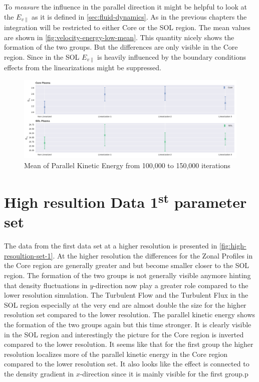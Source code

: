 \documentclass[master.tex]{subfiles}
\begin{document}
To \textit{measure} the influence in the parallel direction it might be helpful to look at the $E_{v\parallel}$ as it is defined in \autoref{sec:fluid-dynamics}.\newline
As in the previous chapters the integration will be restricted to either Core or the \ac{SOL} region. The mean values are shown in \autoref{fig:velocity-energy-low-mean}. This quantity nicely shows the formation of the two groups. But the differences are only visible in the Core region. Since in the \ac{SOL} $E_{v\parallel}$ is heavily influenced by the boundary conditions effects from the linearizations might be suppressed.

\begin{figure}[!htbp]
    \includegraphics[width=\linewidth]{pdfs/velocity-energy-low-means.pdf}
    \caption{Mean of Parallel Kinetic Energy from 100,000 to 150,000 iterations}
    \label{fig:velocity-energy-low-mean}
\end{figure}


\section{High resultion Data 1\textsuperscript{st} parameter set}
The data from the first data set at a higher resolution is presented in \autoref{fig:high-resoultion-set-1}. At the higher resolution the differences for the Zonal Profiles in the Core region are generally greater and but become smaller closer to the \ac{SOL} region. The formation of the two groups is not generally visible anymore hinting that density fluctuations in $y$-direction now play a greater role compared to the lower resolution simulation. The Turbulent Flow and the Turbulent Flux in the \ac{SOL} region especially at the very end are almost double the size for the higher resolution set compared to the lower resolution. The parallel kinetic energy shows the formation of the two groups again but this time stronger. It is clearly visible in the \ac{SOL} region and interestingly the picture for the Core region is inverted compared to the lower resolution. It seems like that for the first group the higher resolution localizes more of the parallel kinetic energy in the Core region compared to the lower resolution set. It also looks like the effect is connected to the density gradient in $x$-direction since it is mainly visible for the first group.p
\end{document}
